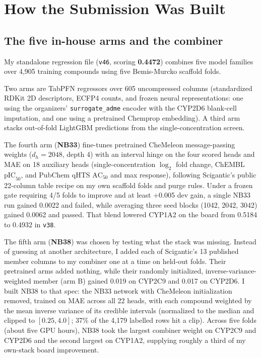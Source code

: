 \documentclass[11pt]{article}
\begin{document}
\section{How the Submission Was Built}

\subsection{The five in-house arms and the combiner}
My standalone regression file (\texttt{v46}, scoring \textbf{0.4472}) combines five model families over 4,905 training compounds using five Bemis-Murcko scaffold folds.

Two arms are TabPFN regressors over 605 uncompressed columns (standardized RDKit 2D descriptors, ECFP4 counts, and frozen neural representations: one using the organizers' \texttt{surrogate\_adme} encoder with the CYP2D6 blank-cell imputation, and one using a pretrained Chemprop embedding). A third arm stacks out-of-fold LightGBM predictions from the single-concentration screen.

The fourth arm (\textbf{NB33}) fine-tunes pretrained CheMeleon message-passing weights ($d_h = 2048$, depth 4) with an interval hinge on the four scored heads and MAE on 18 auxiliary heads (single-concentration $\log_2$ fold change, ChEMBL $\text{pIC}_{50}$, and PubChem qHTS $\text{AC}_{50}$ and max response), following Scigantic's public 22-column table recipe on my own scaffold folds and purge rules. Under a frozen gate requiring 4/5 folds to improve and at least +0.005 dev gain, a single NB33 run gained 0.0022 and failed, while averaging three seed blocks (1042, 2042, 3042) gained 0.0062 and passed. That blend lowered CYP1A2 on the board from 0.5184 to 0.4932 in \texttt{v38}.

The fifth arm (\textbf{NB38}) was chosen by testing what the stack was missing. Instead of guessing at another architecture, I added each of Scigantic's 13 published member columns to my combiner one at a time on held-out folds. Their pretrained arms added nothing, while their randomly initialized, inverse-variance-weighted member (arm B) gained 0.019 on CYP2C9 and 0.017 on CYP2D6. I built NB38 to that spec: the NB33 network with CheMeleon initialization removed, trained on MAE across all 22 heads, with each compound weighted by the mean inverse variance of its credible intervals (normalized to the median and clipped to $[0.25, 4.0]$; 37\% of the 4,179 labelled rows hit a clip). Across five folds (about five GPU hours), NB38 took the largest combiner weight on CYP2C9 and CYP2D6 and the second largest on CYP1A2, supplying roughly a third of my own-stack board improvement.
\end{document}
